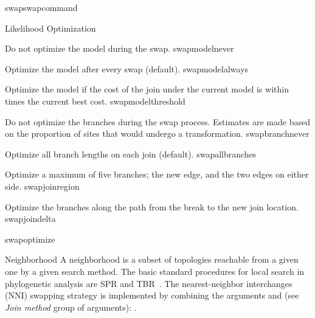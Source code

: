 \begin{command}{swap}{swapcommand}
\begin{arguments}
\begin{argumentgroup}{Likelihood Optimization}
{\begin{description}
                        {Do not optimize the model during the swap.}
                        {swapmodelnever}

                        {Optimize the model after every swap (default).}
                        {swapmodelalways}

                        {Optimize the model if the cost of the join under the
                        current model is within  times the
                        current best cost.}
                        {swapmodelthreshold}

                        {Do not optimize the branches during the swap process.
                        Estimates are made based on the proportion of sites that
                        would undergo a transformation.}
                        {swapbranchnever}

                        {Optimize all branch lengths on each join (default).}
                        {swapallbranches}

                        {Optimize a maximum of five branches; the new edge, and the two
                        edges on either side.}
                        {swapjoinregion}

                        {Optimize the branches along the path from the break to the
                        new join location.}
                        {swapjoindelta}

                \end{description} }
                {swapoptimize}

        \end{argumentgroup}

	    \begin{argumentgroup}{Neighborhood}
	        {A neighborhood is a subset of topologies reachable from a given 
	        one by a given search method. The basic standard procedures for 
	        local search in phylogenetic analysis are SPR and TBR~\cite{swofford1990}. 
	        The nearest-neighbor interchanges (NNI) swapping strategy is implemented by combining 
            the arguments  and  (see \emph{Join method} group of
            arguments): .
            }
            \label{swap_neigh}


\end{argumentgroup}
\end{arguments}
\end{command}

